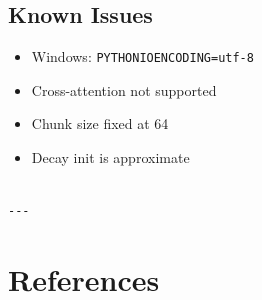 \subsection{Known Issues}

\begin{itemize}
\item Windows: \texttt{PYTHONIOENCODING=utf-8}
\item Cross-attention not supported
\item Chunk size fixed at 64
\item Decay init is approximate
\end{itemize}
\begin{lstlisting}

---
\end{lstlisting}


\section{References}

